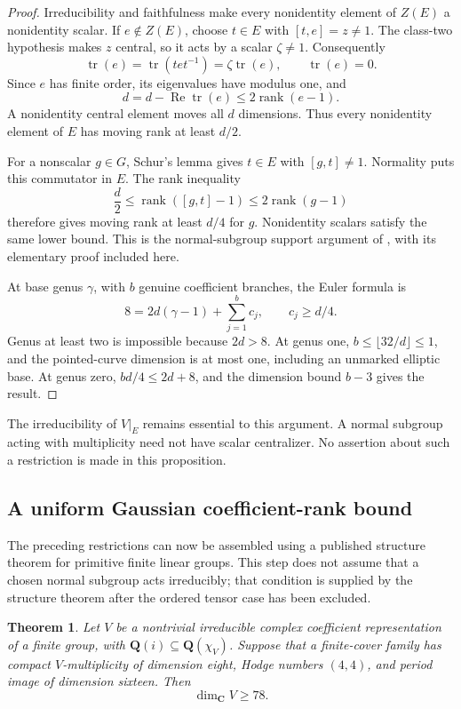 \documentclass[11pt]{article}
\newtheorem{theorem}{Theorem}[section]
\theoremstyle{definition}
\theoremstyle{remark}
\newcommand{\Q}{\mathbf Q}
\begin{document}
\begin{proof}
Irreducibility and faithfulness make every nonidentity element of
$Z(E)$ a nonidentity scalar.  If $e\notin Z(E)$, choose $t\in E$
with $[t,e]=z\ne1$.  The class-two hypothesis makes $z$ central,
so it acts by a scalar $\zeta\ne1$.  Consequently
\[
 \operatorname{tr}(e)=\operatorname{tr}(tet^{-1})
   =\zeta\operatorname{tr}(e),\qquad
 \operatorname{tr}(e)=0.
\]
Since $e$ has finite order, its eigenvalues have modulus one, and
\[
 d=d-\operatorname{Re}\operatorname{tr}(e)
       \leq2\operatorname{rank}(e-1).
\]
A nonidentity central element moves all $d$ dimensions.
Thus every nonidentity element of $E$ has moving rank at least
$d/2$.

For a nonscalar $g\in G$, Schur's lemma gives $t\in E$ with
$[g,t]\ne1$.  Normality puts this commutator in $E$.  The rank
inequality
\[
 \frac d2\leq\operatorname{rank}([g,t]-1)
       \leq2\operatorname{rank}(g-1)
\]
therefore gives moving rank at least $d/4$ for $g$.
Nonidentity scalars satisfy the same lower bound.
This is the normal-subgroup support argument of
\cite[Lemma~3.1]{DuyanHalasiPodoskiRandomBases}, with its
elementary proof included here.

At base genus $\gamma$, with $b$ genuine coefficient branches,
the Euler formula is
\[
 8=2d(\gamma-1)+\sum_{j=1}^b c_j,
 \qquad c_j\geq d/4.
\]
Genus at least two is impossible because $2d>8$.
At genus one, $b\leq\lfloor32/d\rfloor\leq1$, and the
pointed-curve dimension is at most one, including an unmarked
elliptic base.  At genus zero,
$bd/4\leq2d+8$, and the dimension bound $b-3$ gives the result.
\end{proof}

The irreducibility of $V|_E$ remains essential to this argument.
A normal subgroup acting with multiplicity need not have scalar
centralizer.  No assertion about such a restriction is made in
this proposition.


\subsection{A uniform Gaussian coefficient-rank bound}

The preceding restrictions can now be assembled using a published
structure theorem for primitive finite linear groups.  This step
does not assume that a chosen normal subgroup acts irreducibly;
that condition is supplied by the structure theorem after the
ordered tensor case has been excluded.

\begin{theorem}\label{thm:gaussian-rank34}
Let $V$ be a nontrivial irreducible complex coefficient
representation of a finite group, with
$\Q(i)\subseteq\Q(\chi_V)$.  Suppose that a finite-cover
family has compact $V$-multiplicity of dimension eight, Hodge
numbers $(4,4)$, and period image of dimension sixteen.  Then
\[
                         \dim_{\mathbf C}V\geq78.
\]
\end{theorem}
\end{document}
